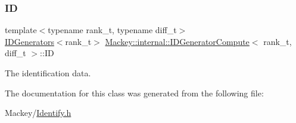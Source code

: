 \subsubsection{\texorpdfstring{ID}{ID}}
{\footnotesize\ttfamily template$<$typename rank\+\_\+t, typename diff\+\_\+t$>$ \\
\hyperlink{classMackey_1_1IDGenerators}{I\+D\+Generators}$<$rank\+\_\+t$>$ \hyperlink{classMackey_1_1internal_1_1IDGeneratorCompute}{Mackey\+::internal\+::\+I\+D\+Generator\+Compute}$<$ rank\+\_\+t, diff\+\_\+t $>$\+::ID}



The identification data. 



The documentation for this class was generated from the following file\+:\begin{DoxyCompactItemize}
\item 
Mackey/\hyperlink{Identify_8h}{Identify.\+h}\end{DoxyCompactItemize}
